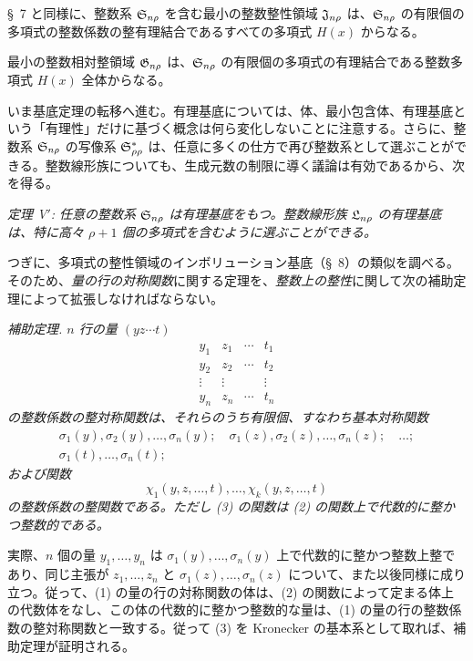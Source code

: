 \documentclass[11pt]{jlreq}
\begin{document}
\S\ 7 と同様に、整数系 $\mathfrak{S}_{n\rho}$ を含む最小の整数整性領域 $\mathfrak{J}_{n\rho}$ は、$\mathfrak{S}_{n\rho}$ の有限個の多項式の整数係数の整有理結合であるすべての多項式 $H(x)$ からなる。

最小の整数相対整領域 $\mathfrak{G}_{n\rho}$ は、$\mathfrak{S}_{n\rho}$ の有限個の多項式の有理結合である整数多項式 $H(x)$ 全体からなる。

いま基底定理の転移へ進む。有理基底については、体、最小包含体、有理基底という「有理性」だけに基づく概念は何ら変化しないことに注意する。さらに、整数系 $\mathfrak{S}_{n\rho}$ の写像系 $\mathfrak{S}^*_{\rho\rho}$ は、任意に多くの仕方で再び整数系として選ぶことができる。整数線形族についても、生成元数の制限に導く議論は有効であるから、次を得る。

\emph{定理 V$'$: 任意の整数系 $\mathfrak{S}_{n\rho}$ は有理基底をもつ。整数線形族 $\mathfrak{L}_{n\rho}$ の有理基底は、特に高々 $\rho+1$ 個の多項式を含むように選ぶことができる。}

つぎに、多項式の整性領域のインボリューション基底（\S\ 8）の類似を調べる。そのため、\emph{量の行の対称関数}に関する定理を、\emph{整数上の整性}に関して次の補助定理によって拡張しなければならない。

\emph{補助定理. $n$ 行の量 $(yz\cdots t)$}
\begin{equation}
\begin{array}{cccc}
  y_1&z_1&\cdots&t_1\\
  y_2&z_2&\cdots&t_2\\
  \vdots&\vdots&&\vdots\\
  y_n&z_n&\cdots&t_n
\end{array}
\tag{1}
\end{equation}
\emph{の整数係数の整対称関数は、それらのうち有限個、すなわち基本対称関数}
\begin{equation}
\begin{gathered}
  \sigma_1(y),\sigma_2(y),\ldots,\sigma_n(y);\quad
  \sigma_1(z),\sigma_2(z),\ldots,\sigma_n(z);\quad\ldots;\\
  \sigma_1(t),\ldots,\sigma_n(t);
\end{gathered}
\tag{2}
\end{equation}
\emph{および関数}
\begin{equation}
  \chi_1(y,z,\ldots,t),\ldots,\chi_k(y,z,\ldots,t)
\tag{3}
\end{equation}
\emph{の整数係数の整関数である。ただし (3) の関数は (2) の関数上で代数的に整かつ整数的である。}

実際、$n$ 個の量 $y_1,\ldots,y_n$ は $\sigma_1(y),\ldots,\sigma_n(y)$ 上で代数的に整かつ整数上整であり、同じ主張が $z_1,\ldots,z_n$ と $\sigma_1(z),\ldots,\sigma_n(z)$ について、また以後同様に成り立つ。従って、(1) の量の行の対称関数の体は、(2) の関数によって定まる体上の代数体をなし、この体の代数的に整かつ整数的な量は、(1) の量の行の整数係数の整対称関数と一致する。従って (3) を Kronecker の基本系として取れば、補助定理が証明される。
\end{document}
